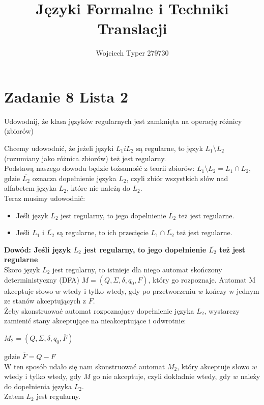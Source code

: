 \documentclass{article}
\title{Języki Formalne i Techniki Translacji}
\author{Wojciech Typer 279730}
\date{}
\begin{document}
\maketitle

\section*{Zadanie 8 Lista 2}
\begin{center}
    Udowodnij, że klasa języków regularnych jest zamknięta na operację różnicy (zbiorów)
\end{center}
Chcemy udowodnić, że jeżeli języki $L_1 i L_2$ są regularne, to język $L_1 \setminus L_2$ (rozumiany jako różnica zbiorów) też jest regularny. \\
Podstawą naszego dowodu będzie tożsamość z teorii zbiorów: $L_1 \setminus L_2 = L_1 \cap \overline{L_2}$, gdzie $\overline{L_2}$ oznacza dopełnienie języka $L_2$,
czyli zbiór wszystkich słów nad alfabetem języka $L_2$, które nie należą do $L_2$. \\
Teraz musimy udowodnić: 
\begin{itemize}
    \item Jeśli język $L_2$ jest regularny, to jego dopełnienie $\overline{L_2}$ też jest regularne. 
    \item Jeśli $L_1$ i $\overline{L_2}$ są regularne, to ich przecięcie $L_1 \cap \overline{L_2}$ też jest regularne.
\end{itemize}
\textbf{Dowód: Jeśli język $L_2$ jest regularny, to jego dopełnienie $\overline{L_2}$ też jest regularne} \\
Skoro język $L_2$ jest regularny, to istnieje dla niego automat skończony deterministyczny (DFA) $M = (Q, \Sigma, \delta, q_0, F)$, który go rozpoznaje.
Automat M akceptuje słowo $w$ wtedy i tylko wtedy, gdy po przetworzeniu $w$ kończy w jednym ze stanów akceptujących z $F$. \\
Żeby skonstruować automat rozpoznający dopełnienie języka $L_2$, wystarczy zamienić stany akceptujące na nieakceptujące i odwrotnie:
\begin{center}
    $M_2 = (Q, \Sigma, \delta, q_0, \overline{F})$
\end{center}
gdzie $\overline{F} = Q - F$ \\
W ten sposób udało się nam skonstruować automat $M_2$, który akceptuje słowo $w$ wtedy i tylko wtedy, gdy $M$ go nie akceptuje, czyli dokładnie wtedy, gdy $w$ należy do dopełnienia języka $L_2$. \\
Zatem $\overline{L_2}$ jest regularny. \\
\end{document}
